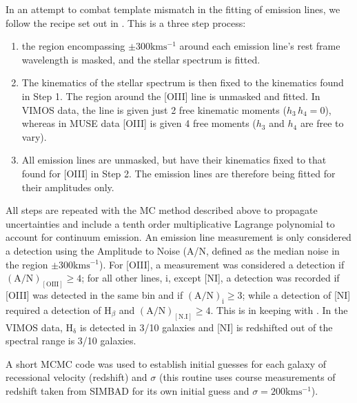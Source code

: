 \documentclass[fleqn,usenatbib,useAMS]{mnras}
\begin{document}
	In an attempt to combat template mismatch in the fitting of emission lines, we follow the recipe set out in \citet{Sarzi2005}. This is a three step process:
	\begin{enumerate}
		\item the region encompassing $\pm 300 \mathrm{km s^{-1}}$ around each emission line's rest frame wavelength is masked, and the stellar spectrum is fitted.
		\item The kinematics of the stellar spectrum is then fixed to the kinematics found in Step 1. The region around the [OIII] line is unmasked and fitted. In VIMOS data, the line is given just 2 free kinematic moments ($h_3 \, h_4 = 0$), whereas in MUSE data [OIII] is given 4 free moments ($h_3$ and $h_4$ are free to vary). 
		\item All emission lines are unmasked, but have their kinematics fixed to that found for [OIII] in Step 2. The emission lines are therefore being fitted for their amplitudes only. 
	\end{enumerate}

	All steps are repeated with the MC method described above to propagate uncertainties and include a tenth order multiplicative Lagrange polynomial to account for continuum emission. An emission line measurement is only considered a detection using the Amplitude to Noise (A/N, defined as the median noise in the region $\pm 300 \mathrm{km s^{-1}}$). For [OIII], a measurement was considered a detection if $(\mathrm{A/N})_\mathrm{[OIII]} \ge 4$; for all other lines, i, except [NI], a detection was recorded if [OIII] was detected in the same bin and if $(\mathrm{A/N})_\mathrm{i} \ge 3$; while a detection of [NI] required a detection of H$_\beta$ and $(\mathrm{A/N})_\mathrm{[N.I]} \ge 4$. This is in keeping with \citet{Sarzi2005}. In the VIMOS data, H$_\mathrm{\delta}$ is detected in 3/10 galaxies and [NI] is redshifted out of the spectral range is 3/10 galaxies.

	A short MCMC code was used to establish initial guesses for each galaxy of recessional velocity (redshift) and $\sigma$ (this routine uses course measurements of redshift taken from SIMBAD \citep{Wenger2000} for its own initial guess and $\sigma = 200 \mathrm{km s^{-1}}$).

\end{document}
